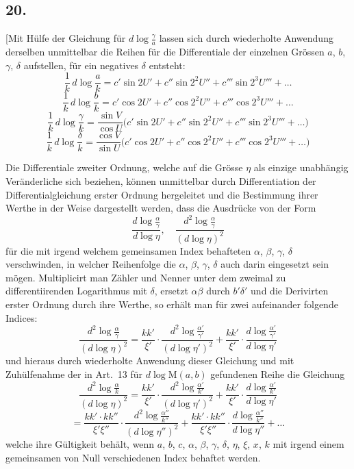 \documentclass[10pt,a4paper]{article}
\newcommand{\M}{\text{M}}
\begin{document}
\subsection*{20.}

[Mit Hülfe der Gleichung für $d\log\frac{\gamma}{a}$ lassen sich durch wiederholte Anwendung
derselben unmittelbar die Reihen für die Differentiale der einzelnen Grössen
$a$, $b$, $\gamma$, $\delta$ aufstellen, für ein negatives $\delta$ entsteht:
\[
\frac{1}{k}\,d\log\frac{a}{k} = c'\sin 2U' + c''\sin 2^2 U'' + c'''\sin 2^3 U''' + \ldots
\]
\[
\frac{1}{k}\,d\log\frac{b}{k} = c'\cos 2U' + c''\cos 2^2 U'' + c'''\cos 2^3 U''' + \ldots
\]
\[
\frac{1}{k}\,d\log\frac{\gamma}{k} = \frac{\sin V}{\cos U}\bigl(c'\sin 2U' + c''\sin 2^2 U'' + c'''\sin 2^3 U''' + \ldots\bigr)
\]
\[
\frac{1}{k}\,d\log\frac{\delta}{k} = \frac{\cos V}{\sin U}\bigl(c'\cos 2U' + c''\cos 2^2 U'' + c'''\cos 2^3 U''' + \ldots\bigr)
\]

Die Differentiale zweiter Ordnung, welche auf die Grösse $\eta$ als einzige
unabhängig Veränderliche sich beziehen, können unmittelbar durch Differentiation der Differentialgleichung erster Ordnung hergeleitet und die Bestimmung
ihrer Werthe in der Weise dargestellt werden, dass die Ausdrücke von der Form
\[
\frac{d\log\frac{\alpha}{\gamma}}{d\log\eta}, \quad
\frac{d^2\log\frac{\alpha}{\gamma}}{(d\log\eta)^2}
\]
für die mit irgend welchem gemeinsamen Index behafteten $\alpha$, $\beta$, $\gamma$, $\delta$ verschwinden, in welcher Reihenfolge die $\alpha$, $\beta$, $\gamma$, $\delta$ auch darin eingesetzt sein mögen.
Multiplicirt man Zähler und Nenner unter dem zweimal zu differentiirenden Logarithmus mit $\delta$, ersetzt $\alpha\beta$ durch $b'\delta'$ und die Derivirten erster Ordnung durch
ihre Werthe, so erhält man für zwei aufeinander folgende Indices:
\[
\frac{d^2\log\frac{\alpha}{\gamma}}{(d\log\eta)^2} = \frac{kk'}{\xi'}\cdot\frac{d^2\log\frac{\alpha'}{\gamma'}}{(d\log\eta')^2} + \frac{kk'}{\xi'}\cdot\frac{d\log\frac{\alpha'}{\gamma'}}{d\log\eta'}
\]
und hieraus durch wiederholte Anwendung dieser Gleichung und mit Zuhülfenahme der in Art.~13 für $d\log \M(a,b)$ gefundenen Reihe die Gleichung
\[
\frac{d^2\log\frac{\alpha}{k}}{(d\log\eta)^2} = \frac{kk'}{\xi'}\cdot\frac{d^2\log\frac{\alpha'}{k'}}{(d\log\eta')^2} + \frac{kk'}{\xi'}\cdot\frac{d\log\frac{\alpha'}{k'}}{d\log\eta'}
\]
\[
= \frac{kk'\cdot kk''}{\xi'\xi''}\cdot\frac{d^2\log\frac{\alpha''}{k''}}{(d\log\eta'')^2} + \frac{kk'\cdot kk''}{\xi'\xi''}\cdot\frac{d\log\frac{\alpha''}{k''}}{d\log\eta''} + \ldots
\]
welche ihre Gültigkeit behält, wenn $a$, $b$, $c$, $\alpha$, $\beta$, $\gamma$, $\delta$, $\eta$, $\xi$, $x$, $k$ mit irgend einem
gemeinsamen von Null verschiedenen Index behaftet werden.
\end{document}
